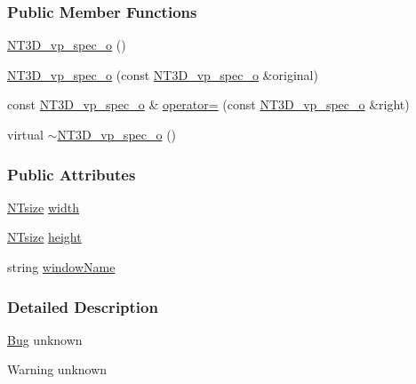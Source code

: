 \subsubsection*{Public Member Functions}
\begin{DoxyCompactItemize}
\item 
\hyperlink{class_n_t3_d__vp__spec__o_a549191f007d9654c2dc414d029b0df89}{NT3D\_\-vp\_\-spec\_\-o} ()
\item 
\hyperlink{class_n_t3_d__vp__spec__o_ac952495c1cbbf8fd1b8347ec02c36065}{NT3D\_\-vp\_\-spec\_\-o} (const \hyperlink{class_n_t3_d__vp__spec__o}{NT3D\_\-vp\_\-spec\_\-o} \&original)
\item 
const \hyperlink{class_n_t3_d__vp__spec__o}{NT3D\_\-vp\_\-spec\_\-o} \& \hyperlink{class_n_t3_d__vp__spec__o_a93d5d044473f605561c671afdd27e717}{operator=} (const \hyperlink{class_n_t3_d__vp__spec__o}{NT3D\_\-vp\_\-spec\_\-o} \&right)
\item 
virtual \hyperlink{class_n_t3_d__vp__spec__o_ae631c51eb1d237fa58525206c6aca161}{$\sim$NT3D\_\-vp\_\-spec\_\-o} ()
\end{DoxyCompactItemize}
\subsubsection*{Public Attributes}
\begin{DoxyCompactItemize}
\item 
\hyperlink{nt__types_8h_a06c124f2e4469769b58230253ce0560b}{NTsize} \hyperlink{class_n_t3_d__vp__spec__o_a87da929f909db08fd929e034084f5b2a}{width}
\item 
\hyperlink{nt__types_8h_a06c124f2e4469769b58230253ce0560b}{NTsize} \hyperlink{class_n_t3_d__vp__spec__o_a8fd810432904e596196d1338a60fbcb0}{height}
\item 
string \hyperlink{class_n_t3_d__vp__spec__o_a2a5895faf835b3fc9af82a852eafb099}{windowName}
\end{DoxyCompactItemize}


\subsubsection{Detailed Description}
\begin{Desc}
\item[\hyperlink{bug__bug000051}{Bug}]unknown \end{Desc}
\begin{DoxyWarning}{Warning}
unknown 
\end{DoxyWarning}


